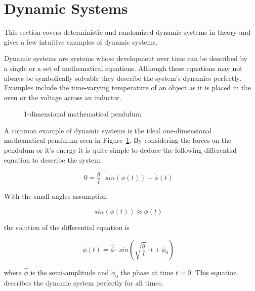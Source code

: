 \section{Dynamic Systems}

\label{sec:dynamicsystems}

This section covers deterministic and randomized dynamic systems in theory and gives a few intuitive examples of dynamic systems.

Dynamic systems are systems whose development over time can be described by a single or a set of mathematical equations. Although these equations may not always be symbolically solvable they describe the system's dynamics perfectly. Examples include the time-varying temperature of an object as it is placed in the oven or the voltage across an inductor.

\begin{figure}
\begin{center}
\end{center}
\caption{1-dimensional mathematical pendulum}
\label{1dpendulum}
\end{figure}

A common example of dynamic systems is the ideal one-dimensional mathematical pendulum seen in Figure~\ref{1dpendulum}. By considering the forces on the pendulum or it's energy it is quite simple to deduce the following differential equation to describe the system:

\[
0 = \frac{g}{l}\cdot sin(\phi(t))+\ddot{\phi}(t)
\]

With the small-angles assumption

\[
sin(\phi(t))\approx\phi(t)
\]

the solution of the differential equation is

\[
\phi(t) = \hat{\phi} \cdot sin( \sqrt{\frac{g}{l}} \cdot t + {\phi}_0)
\]

where $\hat{\phi}$ is the semi-amplitude and ${\phi}_0$ the phase at time $t=0$. This equation describes the dynamic system perfectly for all times.

